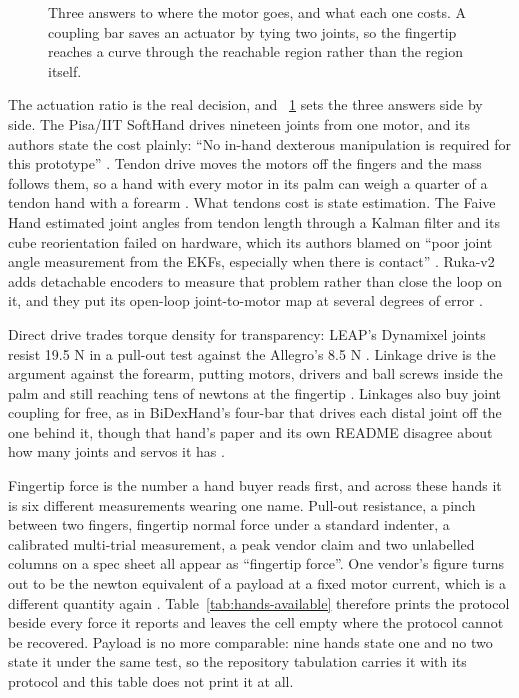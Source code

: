 \begin{figure}[!t] \centering
{}
\caption{Three answers to where the motor goes, and what each one costs. A coupling bar saves
an actuator by tying two joints, so the fingertip reaches a curve through the reachable region
rather than the region itself.} \label{fig:transmission} \end{figure}

The actuation ratio is the real decision, and \figurename~\ref{fig:transmission} sets the three
answers side by side. The Pisa/IIT SoftHand drives nineteen joints from one motor, and its authors
state the cost plainly: ``No in-hand dexterous manipulation is required for this prototype''
\cite{pisa_iit_softhand_2014}. Tendon drive moves the motors off the fingers and the mass follows
them, so a hand with every motor in its palm can weigh a quarter of a tendon hand with a forearm
\cite{shadow_dexterous_hand_2005,ilda_hand_2021}. What tendons cost is state estimation. The Faive
Hand estimated joint angles from tendon length through a Kalman filter and its cube reorientation
failed on hardware, which its authors blamed on ``poor joint angle measurement from the EKFs,
especially when there is contact'' \cite{faive_hand_2023}. Ruka-v2 adds detachable encoders to
measure that problem rather than close the loop on it, and they put its open-loop joint-to-motor
map at several degrees of error \cite{ruka_v2_2026}.

Direct drive trades torque density for transparency: LEAP's Dynamixel joints resist 19.5 N in a
pull-out test against the Allegro's 8.5 N \cite{leap_hand_2023}. Linkage drive is the argument
against the forearm, putting motors, drivers and ball screws inside the palm and still reaching
tens of newtons at the fingertip \cite{ilda_hand_2021}. Linkages also buy joint coupling for free,
as in BiDexHand's four-bar that drives each distal joint off the one behind it, though that hand's
paper and its own README disagree about how many joints and servos it has
\cite{bidexhand_2025}.

Fingertip force is the number a hand buyer reads first, and across these hands it is six
different measurements wearing one name. Pull-out resistance, a pinch between two fingers,
fingertip normal force under a standard indenter, a calibrated multi-trial measurement, a peak
vendor claim and two unlabelled columns on a spec sheet all appear as ``fingertip force''. One
vendor's figure turns out to be the newton equivalent of a payload at a fixed motor current, which
is a different quantity again \cite{orca_hand_2025}. Table~\ref{tab:hands-available} therefore
prints the protocol beside every force it reports and leaves the cell empty where the protocol
cannot be recovered. Payload is no more comparable: nine hands state one and no two state it under
the same test, so the repository tabulation carries it with its protocol and this table does not
print it at all.

